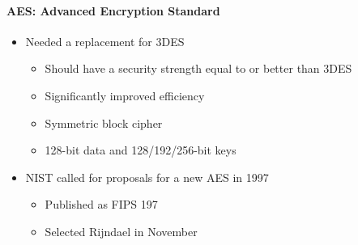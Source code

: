 \documentclass{article}
\begin{document}
                            \paragraph{AES: Advanced Encryption Standard}
                                        \begin{itemize}
                                            \item Needed a replacement for 3DES
                                            \begin{itemize}
                                                \item Should have a security strength equal to or better than 3DES
                                                \item Significantly improved efficiency
                                                \item Symmetric block cipher
                                                \item 128-bit data and 128/192/256-bit keys
                                            \end{itemize}
                                            \item NIST called for proposals for a new AES in 1997
                                            \begin{itemize}
                                                \item Published as FIPS 197
                                                \item Selected Rijndael in November
                                            \end{itemize}
                                        \end{itemize}
\end{document}
